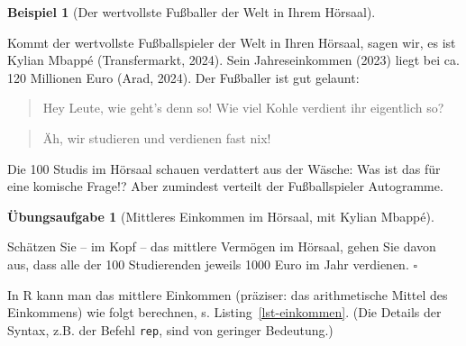 \documentclass[
  letterpaper,
  twoside,
  open=any]{scrbook}
\theoremstyle{definition}
\theoremstyle{definition}
\newtheorem{exercise}{Übungsaufgabe}[chapter]
\theoremstyle{definition}
\newtheorem{example}{Beispiel}[chapter]
\theoremstyle{remark}
\begin{document}
\begin{example}[Der wertvollste Fußballer der Welt in Ihrem
Hörsaal]\protect\hypertarget{exm-md}{}\label{exm-md}

Kommt der wertvollste Fußballspieler der Welt in Ihren Hörsaal, sagen
wir, es ist Kylian Mbappé (Transfermarkt, 2024). Sein Jahreseinkommen
(2023) liegt bei ca. 120 Millionen Euro (Arad, 2024). Der Fußballer ist
gut gelaunt:

\begin{quote}
{} Hey Leute, wie geht's denn so! Wie viel Kohle
verdient ihr eigentlich so?
\end{quote}

\begin{quote}
{} Äh, wir studieren und verdienen fast nix!
\end{quote}

Die 100 Studis im Hörsaal schauen verdattert aus der Wäsche: Was ist das
für eine komische Frage!? Aber zumindest verteilt der Fußballspieler
Autogramme.

\end{example}

\begin{exercise}[Mittleres Einkommen im Hörsaal, mit Kylian
Mbappé]\protect\hypertarget{exr-elon}{}\label{exr-elon}

Schätzen Sie -- im Kopf -- das mittlere Vermögen im Hörsaal, gehen Sie
davon aus, dass alle der 100 Studierenden jeweils 1000 Euro im Jahr
verdienen. \(\square\)

\end{exercise}

In R kann man das mittlere Einkommen (präziser: das arithmetische Mittel
des Einkommens) wie folgt berechnen, s. Listing~\ref{lst-einkommen}.
(Die Details der Syntax, z.B. der Befehl \texttt{rep}, sind von geringer
Bedeutung.)
\end{document}
